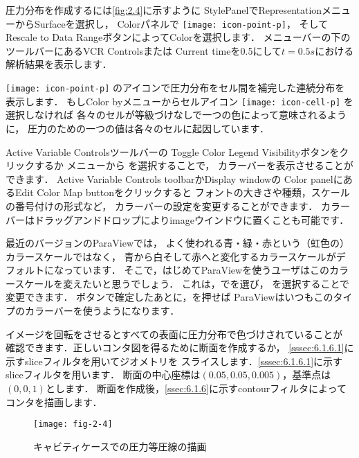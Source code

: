 圧力分布を作成するには\autoref{fig:2.4}に示すように
StylePanelでRepresentationメニューからSurfaceを選択し，
Colorパネルで \texttt{[image: icon-point-p]}，
そしてRescale to Data RangeボタンによってColorを選択します．
メニューバーの下のツールバーにあるVCR Controlsまたは
Current timeを0.5にして$t = 0.5\unit{s}$における解析結果を表示します．

\texttt{[image: icon-point-p]} のアイコンで圧力分布をセル間を補完した連続分布を表示します．
もしColor byメニューからセルアイコン \texttt{[image: icon-cell-p]} を選択しなければ
各々のセルが等級づけなしで一つの色によって意味されるように，
圧力のための一つの値は各々のセルに起因しています．

Active Variable Controlsツールバーの
Toggle Color Legend Visibilityボタンをクリックするか
メニューから
%
%
を選択することで，
カラーバーを表示させることができます．
Active Variable Controls toolbarかDisplay windowの
Color panelにあるEdit Color Map buttonをクリックすると
フォントの大きさや種類，スケールの番号付けの形式など，
カラーバーの設定を変更することができます．
カラーバーはドラッグアンドドロップによりimageウインドウに置くことも可能です．

最近のバージョンのParaViewでは，
よく使われる青・緑・赤という（虹色の）カラースケールではなく，
青から白そして赤へと変化するカラースケールがデフォルトになっています．
そこで，はじめてParaViewを使うユーザはこのカラースケールを変えたいと思うでしょう．
これは，でを選び，
を選択することで変更できます．
ボタンで確定したあとに，を押せば
ParaViewはいつもこのタイプのカラーバーを使うようになります．

イメージを回転をさせるとすべての表面に圧力分布で色づけされていることが
確認できます．正しいコンタ図を得るために断面を作成するか，
\autoref{sssec:6.1.6.1}に示すsliceフィルタを用いてジオメトリを
スライスします．\autoref{sssec:6.1.6.1}に示すsliceフィルタを用います．
断面の中心座標は$(0.05, 0.05, 0.005)$，基準点は$(0, 0, 1)$とします．
断面を作成後，\autoref{ssec:6.1.6}に示すcontourフィルタによってコンタを描画します．


\begin{figure}[ht]
 \texttt{[image: fig-2-4]}
 \caption{キャビティケースでの圧力等圧線の描画}
 \label{fig:2.4}
\end{figure}


